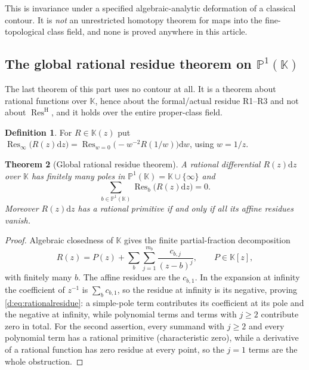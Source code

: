 \documentclass[11pt,a4paper]{article}
\numberwithin{equation}{section}
\newtheorem{theorem}{Theorem}[section]
\theoremstyle{definition}
\newtheorem{definition}[theorem]{Definition}
\theoremstyle{remark}
\theoremstyle{plain}
\newcommand{\K}{\mathbb K}
\DeclareMathOperator{\Res}{Res}                 %
\newcommand{\ResH}[1]{\Res^{\mathrm H}_{#1}}    %
\newcommand{\Resat}[1]{\Res_{#1}}               %
\newcommand{\dd}{\mathrm d}
\begin{document}
This is invariance under a specified algebraic-analytic deformation of a
classical contour.  It is \emph{not} an unrestricted homotopy theorem
for maps into the fine-topological class field, and none is proved
anywhere in this article.

\subsection{The global rational residue theorem on
\texorpdfstring{$\mathbb P^{1}(\K)$}{P1(K)}}
\label{d:sub:rationalresidue}

The last theorem of this part uses no contour at all.  It is a theorem
about rational functions over $\K$, hence about the formal/actual
residue R1--R3 and not about $\ResH{}$, and it holds over the entire
proper-class field.

\begin{definition}
For $R\in\K(z)$ put
$\Resat{\infty}\bigl(R(z)\dd z\bigr)
 =\Res_{w=0}\bigl(-w^{-2}R(1/w)\bigr)\dd w$, using $w=1/z$.
\end{definition}

\begin{theorem}[Global rational residue theorem]
\label{d:thm:rationalresidue}
A rational differential $R(z)\dd z$ over $\K$ has finitely many poles in
$\mathbb P^{1}(\K)=\K\cup\{\infty\}$ and
\begin{equation}\label{d:eq:rationalresidue}
 \sum_{b\in\mathbb P^{1}(\K)}\Resat{b}\bigl(R(z)\dd z\bigr)=0 .
\end{equation}
Moreover $R(z)\dd z$ has a rational primitive if and only if all its
affine residues vanish.
\end{theorem}

\begin{proof}
Algebraic closedness of $\K$ gives the finite partial-fraction
decomposition
\[
 R(z)=P(z)+\sum_{b}\sum_{j=1}^{m_b}\frac{c_{b,j}}{(z-b)^{j}},
 \qquad P\in\K[z],
\]
with finitely many $b$.  The affine residues are the $c_{b,1}$.  In the
expansion at infinity the coefficient of $z^{-1}$ is $\sum_bc_{b,1}$, so
the residue at infinity is its negative, proving
\eqref{d:eq:rationalresidue}: a simple-pole term contributes its
coefficient at its pole and the negative at infinity, while polynomial
terms and terms with $j\ge2$ contribute zero in total.  For the second
assertion, every summand with $j\ge2$ and every polynomial term has a
rational primitive (characteristic zero), while a derivative of a
rational function has zero residue at every point, so the $j=1$ terms
are the whole obstruction.
\end{proof}
\end{document}
